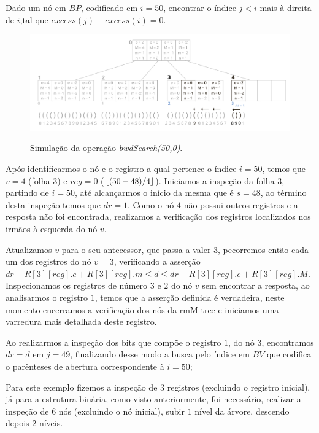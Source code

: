 \begin{example}\label{ex:kary-bwd}
    Dado um nó em $BP$, codificado em $i=50$, encontrar o  índice $j<i$ mais à direita de $i$,tal que $excess(j) - excess(i) = 0$.
    \begin{figure}[htp]
        \centering
          \caption[bwdSearch(50,0).]{Simulação da operação \textit{bwdSearch(50,0)}.}
          \includegraphics[width=\columnwidth]{images/rmm-tree-kary-bwdsearch.png}
          \label{fig:kary-bwdSearch}
     \end{figure}


     Após identificarmos o nó e o registro a qual pertence o índice $i=50$, temos que $v=4$ (folha $3$) e $reg = 0$ ($\lfloor(50-48)/4\rfloor$). Iniciamos a inspeção da folha  $3$, partindo de  $i=50$, até alcançarmos o início da mesma que é $s=48$, ao término desta inspeção temos que $dr=1$. Como o nó $4$ não possui outros registros e a resposta não foi encontrada, realizamos a verificação dos registros localizados nos irmãos à esquerda do nó $v$.

     Atualizamos $v$ para o seu antecessor, que passa a valer $3$, pecorremos então cada um dos registros do nó $v=3$, verificando a asserção $dr - R[3][reg].e + R[3][reg].m \leq d \leq dr - R[3][reg].e + R[3][reg].M$. Inspecionamos os registros de número $3$ e $2$ do nó $v$ sem encontrar a resposta, ao analisarmos o registro $1$, temos que a asserção definida é verdadeira, neste momento encerramos a verificação dos nós da rmM-tree e iniciamos uma varredura mais detalhada deste registro. 

     Ao realizarmos a inspeção dos bits que compõe o registro $1$, do nó $3$, encontramos $dr=d$ em $j=49$, finalizando desse modo a busca pelo índice em $BV$ que codifica o parênteses de abertura correspondente à $i=50$;
     

     Para este exemplo fizemos a inspeção de $3$ registros (excluindo o registro inicial), já para a estrutura binária, como visto anteriormente, foi necessário, realizar a inspeção de  $6$ nós (excluindo o nó inicial), subir $1$ nível da árvore, descendo depois $2$ níveis.
     
    \end{example}

